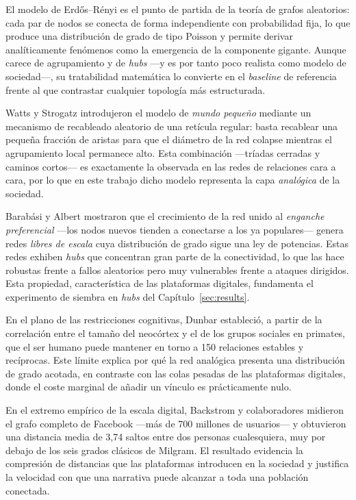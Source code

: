 \documentclass[12pt]{extarticle}
\numberwithin{equation}{section}
\begin{document}
El modelo de Erd\H{o}s--R\'enyi \cite{ErdosRenyi1960} es el punto de partida de la teor\'ia de grafos aleatorios: cada par de nodos se conecta de forma independiente con probabilidad fija, lo que produce una distribuci\'on de grado de tipo Poisson y permite derivar anal\'iticamente fen\'omenos como la emergencia de la componente gigante. Aunque carece de agrupamiento y de \emph{hubs} —y es por tanto poco realista como modelo de sociedad—, su tratabilidad matem\'atica lo convierte en el \emph{baseline} de referencia frente al que contrastar cualquier topolog\'ia m\'as estructurada.

Watts y Strogatz \cite{WattsStrogatz1998} introdujeron el modelo de \emph{mundo peque\~no} mediante un mecanismo de recableado aleatorio de una ret\'icula regular: basta recablear una peque\~na fracci\'on de aristas para que el di\'ametro de la red colapse mientras el agrupamiento local permanece alto. Esta combinaci\'on —tr\'iadas cerradas y caminos cortos— es exactamente la observada en las redes de relaciones cara a cara, por lo que en este trabajo dicho modelo representa la capa \emph{anal\'ogica} de la sociedad.

Barab\'asi y Albert \cite{BarabasiAlbert1999} mostraron que el crecimiento de la red unido al \emph{enganche preferencial} —los nodos nuevos tienden a conectarse a los ya populares— genera redes \emph{libres de escala} cuya distribuci\'on de grado sigue una ley de potencias. Estas redes exhiben \emph{hubs} que concentran gran parte de la conectividad, lo que las hace robustas frente a fallos aleatorios pero muy vulnerables frente a ataques dirigidos. Esta propiedad, caracter\'istica de las plataformas digitales, fundamenta el experimento de siembra en \emph{hubs} del Cap\'itulo~\ref{sec:results}.

En el plano de las restricciones cognitivas, Dunbar \cite{Dunbar1992} estableci\'o, a partir de la correlaci\'on entre el tama\~no del neoc\'ortex y el de los grupos sociales en primates, que el ser humano puede mantener en torno a 150 relaciones estables y rec\'iprocas. Este l\'imite explica por qu\'e la red anal\'ogica presenta una distribuci\'on de grado acotada, en contraste con las colas pesadas de las plataformas digitales, donde el coste marginal de a\~nadir un v\'inculo es pr\'acticamente nulo.

En el extremo emp\'irico de la escala digital, Backstrom y colaboradores \cite{Backstrom2012} midieron el grafo completo de Facebook —m\'as de 700 millones de usuarios— y obtuvieron una distancia media de 3,74 saltos entre dos personas cualesquiera, muy por debajo de los seis grados cl\'asicos de Milgram. El resultado evidencia la compresi\'on de distancias que las plataformas introducen en la sociedad y justifica la velocidad con que una narrativa puede alcanzar a toda una poblaci\'on conectada.
\end{document}
